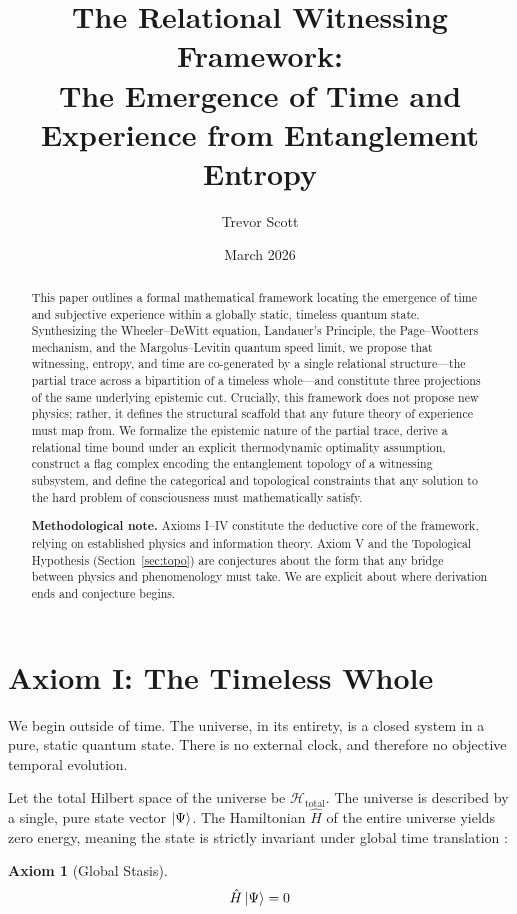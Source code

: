 \documentclass[12pt, a4paper]{article}
\title{\textbf{The Relational Witnessing Framework:} \\ 
The Emergence of Time and Experience from Entanglement Entropy}
\author{Trevor Scott}
\date{March 2026}
\newtheorem{axiom}{Axiom}
\begin{document}
\maketitle

\begin{abstract}
This paper outlines a formal mathematical framework locating the emergence of time and subjective experience within a globally static, timeless quantum state. Synthesizing the Wheeler--DeWitt equation, Landauer's Principle, the Page--Wootters mechanism, and the Margolus--Levitin quantum speed limit, we propose that witnessing, entropy, and time are co-generated by a single relational structure---the partial trace across a bipartition of a timeless whole---and constitute three projections of the same underlying epistemic cut. Crucially, this framework does not propose new physics; rather, it defines the structural scaffold that any future theory of experience must map from. We formalize the epistemic nature of the partial trace, derive a relational time bound under an explicit thermodynamic optimality assumption, construct a flag complex encoding the entanglement topology of a witnessing subsystem, and define the categorical and topological constraints that any solution to the hard problem of consciousness must mathematically satisfy.

\medskip
\noindent \textbf{Methodological note.} Axioms I--IV constitute the deductive core of the framework, relying on established physics and information theory. Axiom V and the Topological Hypothesis (Section~\ref{sec:topo}) are conjectures about the form that any bridge between physics and phenomenology must take. We are explicit about where derivation ends and conjecture begins.
\end{abstract}

\section{Axiom I: The Timeless Whole}
\label{sec:axiom1}

We begin outside of time. The universe, in its entirety, is a closed system in a pure, static quantum state. There is no external clock, and therefore no objective temporal evolution.

Let the total Hilbert space of the universe be $\mathcal{H}_{\mathrm{total}}$. The universe is described by a single, pure state vector $\ket{\Psi}$. The Hamiltonian $\hat{H}$ of the entire universe yields zero energy, meaning the state is strictly invariant under global time translation \cite{DeWitt1967}:
\begin{axiom}[Global Stasis]
\begin{equation}
\hat{H}\ket{\Psi} = 0
\label{eq:WDW}
\end{equation}
\end{axiom}
\end{document}
